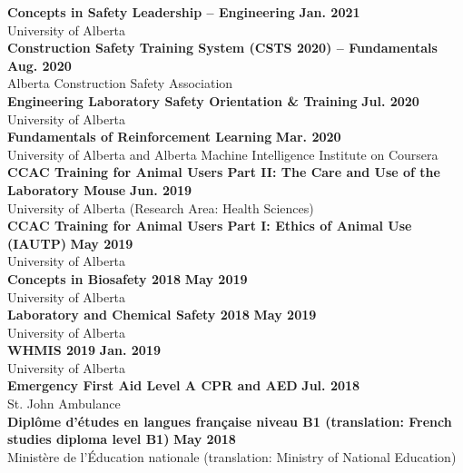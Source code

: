 \documentclass{article}
\begin{document}
    \textbf{Concepts in Safety Leadership -- Engineering} \hfill \textbf{Jan. 2021}\\
    University of Alberta\\[0.5em]
    \textbf{Construction Safety Training System (CSTS 2020) -- Fundamentals} \hfill \textbf{Aug. 2020}\\
    Alberta Construction Safety Association\\[0.5em]
	\textbf{Engineering Laboratory Safety Orientation \& Training} \hfill \textbf{Jul. 2020}\\
	University of Alberta\\[0.5em]
    \textbf{Fundamentals of Reinforcement Learning} \hfill \textbf{Mar. 2020}\\
    University of Alberta and Alberta Machine Intelligence Institute on Coursera\\[0.5em]
    \textbf{CCAC Training for Animal Users Part II: The Care and Use of the Laboratory Mouse} \hfill \textbf{Jun. 2019}\\
    University of Alberta (Research Area: Health Sciences)\\[0.5em]
    \textbf{CCAC Training for Animal Users Part I: Ethics of Animal Use (IAUTP)} \hfill \textbf{May 2019}\\
    University of Alberta\\[0.5em]
    \textbf{Concepts in Biosafety 2018} \hfill \textbf{May 2019}\\
    University of Alberta\\[0.5em]
    \textbf{Laboratory and Chemical Safety 2018} \hfill \textbf{May 2019}\\
    University of Alberta\\[0.5em]
    \textbf{WHMIS 2019} \hfill \textbf{Jan. 2019}\\
    University of Alberta\\[0.5em]
    \textbf{Emergency First Aid Level A CPR and AED} \hfill \textbf{Jul. 2018}\\
    St. John Ambulance\\[0.5em]
    \textbf{Dipl\^ome d'\'etudes en langues fran\c{c}aise niveau B1 (translation: French studies diploma level B1)} \hfill \textbf{May 2018}\\
    Minist\`ere de l'\'Education nationale (translation: Ministry of National Education)
\end{document}

